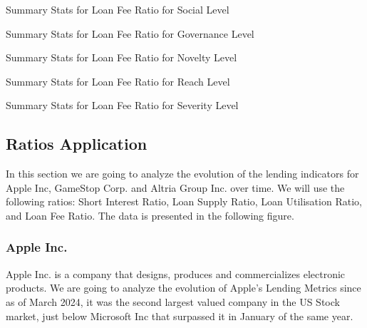\begin{table}[H]
\caption{Summary Stats for Loan Fee Ratio for Social Level}
\centering

\label{table:loan_fee_social.tex}
\end{table}

\begin{table}[H]
\caption{Summary Stats for Loan Fee Ratio for Governance Level}
\centering

\label{table:loan_fee_governance.tex}
\end{table}


\begin{table}[H]
\caption{Summary Stats for Loan Fee Ratio for Novelty Level}
\centering

\label{table:loan_fee_novelty.tex}
\end{table}

\begin{table}[H]
\caption{Summary Stats for Loan Fee Ratio for Reach Level}
\centering

\label{table:loan_fee_reach.tex}
\end{table}

\begin{table}[H]
\caption{Summary Stats for Loan Fee Ratio for Severity Level}
\centering

\label{table:loan_fee_severity.tex}
\end{table}




\subsection{Ratios Application}

In this section we are going to analyze the evolution of the lending indicators for Apple Inc, GameStop Corp. and Altria Group Inc. over time. We will use the following ratios: Short Interest Ratio, Loan Supply Ratio, Loan Utilisation Ratio, and Loan Fee Ratio. The data is presented in the following figure.

\subsubsection{Apple Inc.}

Apple Inc. is a company that designs, produces and commercializes electronic products. We are going to analyze the evolution of Apple's Lending Metrics since as of March 2024, it was the second largest valued company in the US Stock market, just below Microsoft Inc that surpassed it in January of the same year.

